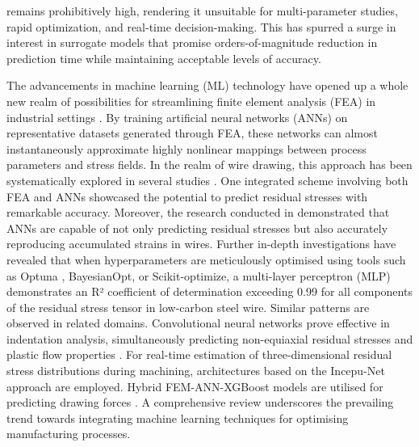 \documentclass[subscriptcorrection,upint,varvw,barcolor=Goldenrod3,mathalfa=cal=euler,balance,hyphenate,french,pdf-a]{asmejour} %
\begin{document}
remains prohibitively high, rendering it unsuitable for multi-parameter studies, rapid optimization, and real-time decision-making. This has spurred a surge in interest in surrogate models that promise orders-of-magnitude reduction in prediction time while maintaining acceptable levels of accuracy.

The advancements in machine learning (ML) technology have opened up a whole new realm of possibilities for streamlining finite element analysis (FEA) in industrial settings \citep{mozaffar2022mechanistic, goodfellow2016deep, weichert2019review}. By training artificial neural networks (ANNs) on representative datasets generated through FEA, these networks can almost instantaneously approximate highly nonlinear mappings between process parameters and stress fields.
In the realm of wire drawing, this approach has been systematically explored in several studies \citep{gromov2026residual,demin2025forecasting,demin2024application}. One integrated scheme involving both FEA and ANNs \citep{gromov2026residual} showcased the potential to predict residual stresses with remarkable accuracy. Moreover, the research conducted in \citep{demin2024application} demonstrated that ANNs are capable of not only predicting residual stresses but also accurately reproducing accumulated strains in wires.
Further in-depth investigations have revealed that when hyperparameters are meticulously optimised using tools such as Optuna \citep{akiba2019optunanextgenerationhyperparameteroptimization}, BayesianOpt, or Scikit-optimize, a multi-layer perceptron (MLP) demonstrates an R² coefficient of determination exceeding 0.99 for all components of the residual stress tensor in low-carbon steel wire. Similar patterns are observed in related domains. Convolutional neural networks prove effective in indentation analysis, simultaneously predicting non-equiaxial residual stresses and plastic flow properties \citep{park2026indentation, han2024evaluation}. For real-time estimation of three-dimensional residual stress distributions during machining, architectures based on the Incepu-Net approach \citep{wang2025online} are employed. Hybrid FEM-ANN-XGBoost models are utilised for predicting drawing forces \citep{tsui2026metrology}.
A comprehensive review \citep{weichert2019review} underscores the prevailing trend towards integrating machine learning techniques for optimising manufacturing processes.
\end{document}
